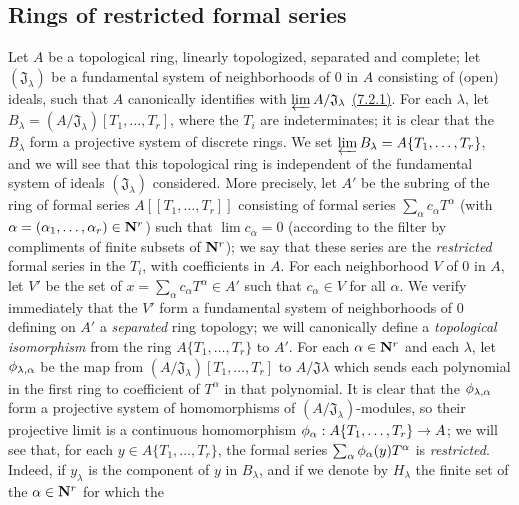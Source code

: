 \subsection{Rings of restricted formal series}
\label{subsection-rings-of-restricted-formal-series}

\begin{env}[7.5.1]
\label{env-0.7.5.1}
Let $A$ be a topological ring, linearly topologized, separated and complete; let
$(\mathfrak{J}_\lambda)$ be a fundamental system of neighborhoods of $0$ in $A$
consisting of (open) ideals, such that $A$ canonically identifies with
$\varprojlim A/\mathfrak{J}_\lambda$ \hyperref[env-0.7.2.1]{(7.2.1)}. For each
$\lambda$, let $B_\lambda=(A/\mathfrak{J}_\lambda)[T_1,\dots,T_r]$, where the
$T_i$ are indeterminates; it is clear that the $B_\lambda$ form a projective system
of discrete rings. We set $\varprojlim B_\lambda=A\{T_1,\dots,T_r\}$, and we will
see that this topological ring is independent of the fundamental system of ideals
$(\mathfrak{J}_\lambda)$ considered. More precisely, let $A'$ be the subring of the
ring of formal series $A[\![T_1,\dots,T_r]\!]$ consisting of formal series
$\sum_\alpha c_\alpha T^\alpha$ (with $\alpha=(\alpha_1,\dots,\alpha_r)\in\mathbf{N}^r$)
such that $\lim c_\alpha=0$ (according to the filter by compliments of finite subsets
of $\mathbf{N}^r$); we say that these series are the {\em restricted} formal series in the
$T_i$, with coefficients in $A$.
For each neighborhood $V$ of $0$ in $A$, let $V'$ be the set of
$x=\sum_\alpha c_\alpha T^\alpha\in A'$ such that $c_\alpha\in V$ for all $\alpha$.
We verify immediately that the $V'$ form a fundamental system of neighborhoods of $0$
defining on $A'$ a {\em separated} ring topology; we will canonically define a
{\em topological isomorphism} from the ring $A\{T_1,\dots,T_r\}$ to $A'$. For each
$\alpha\in\mathbf{N}^r$ and each $\lambda$, let $\phi_{\lambda,\alpha}$ be the map from
$(A/\mathfrak{J}_\lambda)[T_1,\dots,T_r]$ to $A/\mathfrak{J}\lambda$ which sends each
polynomial in the first ring to coefficient of $T^\alpha$ in that polynomial. It is
clear that the $\phi_{\lambda,\alpha}$ form a projective system of homomorphisms of
$(A/\mathfrak{J}_\lambda)$-modules, so their projective limit is a continuous
homomorphism $\phi_\alpha:A\{T_1,\dots,T_r\}\to A$; we will see that, for each
$y\in A\{T_1,\dots,T_r\}$, the formal series $\sum_\alpha\phi_\alpha(y)T^\alpha$ is
{\em restricted}. Indeed, if $y_\lambda$ is the component of $y$ in $B_\lambda$, and
if we denote by $H_\lambda$ the finite set of the $\alpha\in\mathbf{N}^r$ for which the

\end{env}
